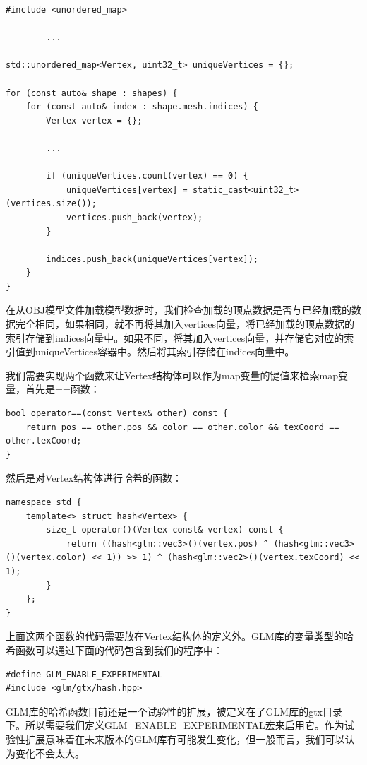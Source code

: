 \documentclass{ctexart}
\begin{document}
\begin{lstlisting}[language={[ANSI]C}]
#include <unordered_map>

		...

std::unordered_map<Vertex, uint32_t> uniqueVertices = {};

for (const auto& shape : shapes) {
	for (const auto& index : shape.mesh.indices) {
		Vertex vertex = {};

		...

		if (uniqueVertices.count(vertex) == 0) {
			uniqueVertices[vertex] = static_cast<uint32_t>(vertices.size());
			vertices.push_back(vertex);
		}

		indices.push_back(uniqueVertices[vertex]);
	}
}
\end{lstlisting}

在从OBJ模型文件加载模型数据时，我们检查加载的顶点数据是否与已经加载的数据完全相同，如果相同，就不再将其加入vertices向量，将已经加载的顶点数据的索引存储到indices向量中。如果不同，将其加入vertices向量，并存储它对应的索引值到uniqueVertices容器中。然后将其索引存储在indices向量中。

我们需要实现两个函数来让Vertex结构体可以作为map变量的键值来检索map变量，首先是==函数：

\begin{lstlisting}[language={[ANSI]C}]
bool operator==(const Vertex& other) const {
	return pos == other.pos && color == other.color && texCoord == other.texCoord;
}
\end{lstlisting}

然后是对Vertex结构体进行哈希的函数：

\begin{lstlisting}[language={[ANSI]C}]
namespace std {
	template<> struct hash<Vertex> {
		size_t operator()(Vertex const& vertex) const {
			return ((hash<glm::vec3>()(vertex.pos) ^ (hash<glm::vec3>()(vertex.color) << 1)) >> 1) ^ (hash<glm::vec2>()(vertex.texCoord) << 1);
		}
	};
}
\end{lstlisting}

上面这两个函数的代码需要放在Vertex结构体的定义外。GLM库的变量类型的哈希函数可以通过下面的代码包含到我们的程序中：

\begin{lstlisting}[language={[ANSI]C}]
#define GLM_ENABLE_EXPERIMENTAL
#include <glm/gtx/hash.hpp>
\end{lstlisting}

GLM库的哈希函数目前还是一个试验性的扩展，被定义在了GLM库的gtx目录下。所以需要我们定义GLM\_ENABLE\_EXPERIMENTAL宏来启用它。作为试验性扩展意味着在未来版本的GLM库有可能发生变化，但一般而言，我们可以认为变化不会太大。
\end{document}
